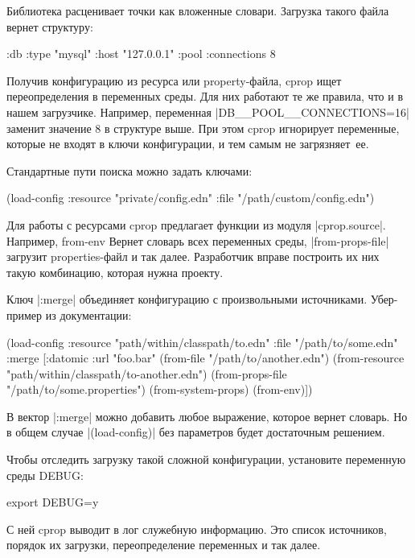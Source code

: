Библиотека расценивает точки как вложенные словари. Загрузка такого файла вернет
структуру:

\begin{code}
{:db {:type "mysql"
      :host "127.0.0.1"
      :pool {:connections 8}}}
\end{code}

Получив конфигурацию из ресурса или property-файла, cprop ищет переопределения в
переменных среды. Для них работают те же правила, что и в нашем
загрузчике. Например, переменная \spverb|DB__POOL__CONNECTIONS=16| заменит
значение 8 в структуре выше. При этом cprop игнорирует переменные, которые не
входят в ключи конфигурации, и тем самым не загрязняет~ее.

Стандартные пути поиска можно задать ключами:

\begin{code}
(load-config
 :resource "private/config.edn"
 :file "/path/custom/config.edn")
\end{code}

Для работы с ресурсами cprop предлагает функции из модуля
\spverb|cprop.source|. Например, from-env Вернет словарь всех переменных среды,
\spverb|from-props-file| загрузит properties-файл и так далее. Разработчик вправе
построить их них такую комбинацию, которая нужна проекту.

Ключ \spverb|:merge| объединяет конфигурацию с произвольными источниками. Убер-пример
из документации:

\begin{code}
(load-config
 :resource "path/within/classpath/to.edn"
 :file "/path/to/some.edn"
 :merge [{:datomic {:url "foo.bar"}}
         (from-file "/path/to/another.edn")
         (from-resource "path/within/classpath/to-another.edn")
         (from-props-file "/path/to/some.properties")
         (from-system-props)
         (from-env)])
\end{code}

В вектор \spverb|:merge| можно добавить любое выражение, которое вернет словарь. Но в
общем случае \spverb|(load-config)| без параметров будет достаточным решением.

Чтобы отследить загрузку такой сложной конфигурации, установите переменную среды
DEBUG:

\begin{code}
export DEBUG=y
\end{code}

С ней cprop выводит в лог служебную информацию. Это список источников, порядок
их загрузки, переопределение переменных и так далее.

